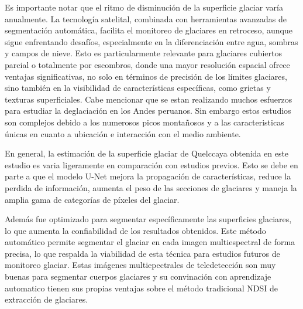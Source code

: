 Es importante notar que el ritmo de disminución de la superficie glaciar varía anualmente. La tecnología satelital, combinada con herramientas avanzadas de segmentación automática, facilita el monitoreo de glaciares en retroceso, aunque sigue enfrentando desafíos, especialmente en la diferenciación entre agua, sombras y campos de nieve. Esto es particularmente relevante para glaciares cubiertos parcial o totalmente por escombros, donde una mayor resolución espacial ofrece ventajas significativas, no solo en términos de precisión de los límites glaciares, sino también en la visibilidad de características específicas, como grietas y texturas superficiales. Cabe mencionar que se estan realizando muchos esfuerzos para estudiar la deglaciación en los Andes peruanos. Sin embargo estos estudios son complejos debido a los numerosos picos montañosos y a las caracteristicas únicas en cuanto a ubicación e interacción con el medio ambiente. 

En general, la estimación de la superficie glaciar de Quelccaya obtenida en este estudio es varia ligeramente en comparación con estudios previos. Esto se debe en parte a que el modelo U-Net mejora la propagación de características, reduce la perdida de información, aumenta el peso de las secciones de glaciares y maneja la amplia gama de categorías de píxeles del glaciar. 

Además fue optimizado para segmentar específicamente las superficies glaciares, lo que aumenta la confiabilidad de los resultados obtenidos. Este método automático permite segmentar el glaciar en cada imagen multiespectral de forma precisa, lo que respalda la viabilidad de esta técnica para estudios futuros de monitoreo glaciar. Estas imágenes multiepectrales de teledetección son muy buenas para segmentar cuerpos glaciares y su convinación con aprendizaje automatico tienen sus propias ventajas sobre el método tradicional NDSI de extracción de glaciares.

\singlespacing







